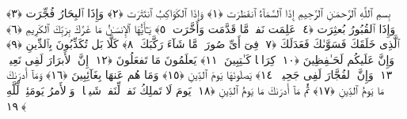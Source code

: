
  
    
  
    
    

\nopagebreak
  بِسمِ ٱللَّهِ ٱلرَّحمَـٰنِ ٱلرَّحِيمِ
  إِذَا ٱلسَّمَآءُ ٱنفَطَرَت ﴿١﴾
 وَإِذَا ٱلكَوَاكِبُ ٱنتَثَرَت ﴿٢﴾
 وَإِذَا ٱلبِحَارُ فُجِّرَت ﴿٣﴾
 وَإِذَا ٱلقُبُورُ بُعثِرَت ﴿٤﴾
 عَلِمَت نَفسٌۭ مَّا قَدَّمَت وَأَخَّرَت ﴿٥﴾
 يَـٰٓأَيُّهَا ٱلإِنسَـٰنُ مَا غَرَّكَ بِرَبِّكَ ٱلكَرِيمِ ﴿٦﴾
 ٱلَّذِى خَلَقَكَ فَسَوَّىٰكَ فَعَدَلَكَ ﴿٧﴾
 فِىٓ أَىِّ صُورَةٍۢ مَّا شَآءَ رَكَّبَكَ ﴿٨﴾
 كَلَّا بَل تُكَذِّبُونَ بِٱلدِّينِ ﴿٩﴾
 وَإِنَّ عَلَيكُم لَحَـٰفِظِينَ ﴿١٠﴾
 كِرَامًۭا كَـٰتِبِينَ ﴿١١﴾
 يَعلَمُونَ مَا تَفعَلُونَ ﴿١٢﴾
 إِنَّ ٱلأَبرَارَ لَفِى نَعِيمٍۢ ﴿١٣﴾
 وَإِنَّ ٱلفُجَّارَ لَفِى جَحِيمٍۢ ﴿١٤﴾
 يَصلَونَهَا يَومَ ٱلدِّينِ ﴿١٥﴾
 وَمَا هُم عَنهَا بِغَآئِبِينَ ﴿١٦﴾
 وَمَآ أَدرَىٰكَ مَا يَومُ ٱلدِّينِ ﴿١٧﴾
 ثُمَّ مَآ أَدرَىٰكَ مَا يَومُ ٱلدِّينِ ﴿١٨﴾
 يَومَ لَا تَملِكُ نَفسٌۭ لِّنَفسٍۢ شَيـًۭٔا ۖ وَٱلأَمرُ يَومَئِذٍۢ لِّلَّهِ ﴿١٩﴾
 
